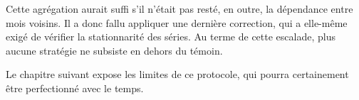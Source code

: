 Cette agrégation aurait suffi s'il n'était pas resté, en outre, la dépendance
entre mois voisins. Il a donc fallu appliquer une dernière correction, qui a
elle-même exigé de vérifier la stationnarité des séries. Au terme de cette
escalade, plus aucune stratégie ne subsiste en dehors du témoin.

Le chapitre suivant expose les limites de ce protocole, qui pourra certainement
être perfectionné avec le temps.